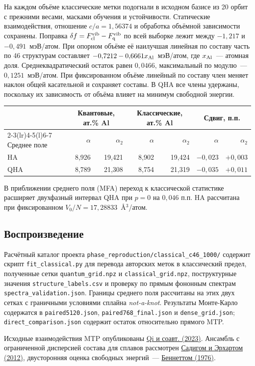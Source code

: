 \documentclass[11pt,a4paper]{article}
\begin{document}
На каждом объёме классические метки подогнали в исходном базисе из
20 орбит с прежними весами, масками обучения и устойчивости.
Статические взаимодействия, отношение \(c/a=1{,}56374\) и обработка
объёмной зависимости сохранены. Поправка
\(\delta f=F_{\rm cl}^{\rm vib}-F_{\rm q}^{\rm vib}\) по всей выборке
лежит между \(-1{,}217\) и \(-0{,}491\)~мэВ/атом. При опорном объёме
её наилучшая линейная по составу часть по 46 структурам составляет
\(-0{,}7212-0{,}6661x_{\rm Al}\)~мэВ/атом, где \(x_{\rm Al}\)~---
атомная доля. Среднеквадратический остаток равен \(0{,}0466\), максимальный
по модулю~--- \(0{,}1251\)~мэВ/атом. При фиксированном объёме линейный
по составу член меняет наклон общей касательной и сохраняет составы.
В QHA все члены удержаны, поскольку их зависимость от объёма влияет на
минимум свободной энергии.

\begin{center}
\small
\begin{tabular}{@{}lrrrrrr@{}}
\toprule
 & \multicolumn{2}{c}{Квантовые, ат.\% Al}
 & \multicolumn{2}{c}{Классические, ат.\% Al}
 & \multicolumn{2}{c}{Сдвиг, п.п.}\\
\cmidrule(lr){2-3}\cmidrule(lr){4-5}\cmidrule(l){6-7}
Среднее поле & \(\alpha\) & \(\alpha_2\) & \(\alpha\) & \(\alpha_2\)
 & \(\alpha\) & \(\alpha_2\)\\
\midrule
HA  & 8,926 & 19,421 & 8,902 & 19,424 & \(-0{,}023\) & \(+0{,}003\)\\
QHA & 8,789 & 21,308 & 8,754 & 21,319 & \(-0{,}035\) & \(+0{,}011\)\\
\bottomrule
\end{tabular}
\end{center}
В приближении среднего поля (MFA) переход к классической статистике
расширяет двухфазный интервал QHA при \(p=0\) на \(0{,}046\) п.п.
HA рассчитана при фиксированном \(V_0/N=17{,}28833\)~\AA$^3$/атом.
\subsection*{Воспроизведение}
Расчётный каталог проекта \nolinkurl{phase_reproduction/classical_c46_1000/}
содержит скрипт \nolinkurl{fit_classical.py} для перевода авторских меток в
классический предел, полученные сетки \nolinkurl{quantum_grid.npz} и
\nolinkurl{classical_grid.npz}, поструктурные значения
\nolinkurl{structure_labels.csv} и проверку по прямым фононным спектрам
\nolinkurl{spectra_validation.json}. Границы среднего поля рассчитаны на этих
двух сетках с граничными условиями сплайна \emph{not-a-knot}.
Результаты Монте-Карло содержатся в \nolinkurl{paired5120.json},
\nolinkurl{paired768_final.json} и \nolinkurl{dense_grid.json};
\nolinkurl{direct_comparison.json} содержит остаток относительно прямого MTP.

Исходные взаимодействия MTP опубликованы
\href{https://doi.org/10.1103/PhysRevMaterials.7.103602}{Qi и соавт. (2023)}.
Ансамбль с ограниченной дисперсией состава для сплавов рассмотрен
\href{https://doi.org/10.1103/PhysRevB.86.134204}{Садигом и Эрхартом (2012)},
двусторонняя оценка свободных энергий~---
\href{https://doi.org/10.1016/0021-9991(76)90078-4}{Беннеттом (1976)}.
\end{document}
